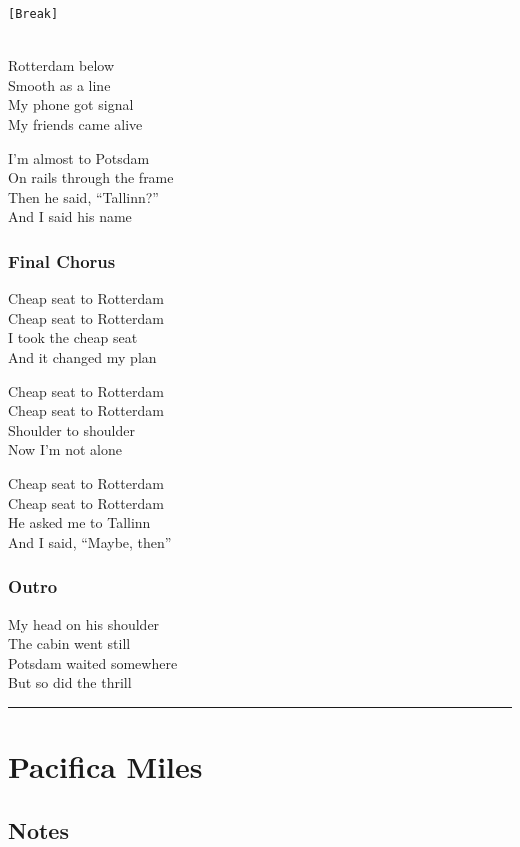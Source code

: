\texttt{{[}Break{]}}\strut \\
Rotterdam below\\
Smooth as a line\\
My phone got signal\\
My friends came alive

I'm almost to Potsdam\\
On rails through the frame\\
Then he said, ``Tallinn?''\\
And I said his name

\subsubsection{Final Chorus}\label{final-chorus-8}

Cheap seat to Rotterdam\\
Cheap seat to Rotterdam\\
I took the cheap seat\\
And it changed my plan

Cheap seat to Rotterdam\\
Cheap seat to Rotterdam\\
Shoulder to shoulder\\
Now I'm not alone

Cheap seat to Rotterdam\\
Cheap seat to Rotterdam\\
He asked me to Tallinn\\
And I said, ``Maybe, then''

\subsubsection{Outro}\label{outro-8}

My head on his shoulder\\
The cabin went still\\
Potsdam waited somewhere\\
But so did the thrill

\begin{center}\rule{0.5\linewidth}{0.5pt}\end{center}

\section{Pacifica Miles}\label{pacifica-miles}

\subsection{Notes}\label{notes-30}

